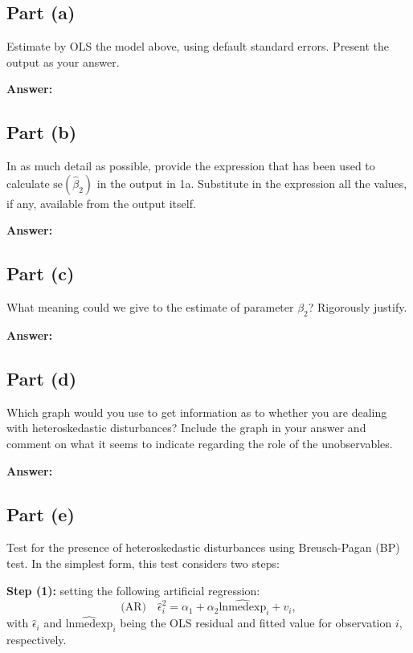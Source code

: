 \documentclass[12pt,a4paper]{article}
\begin{document}
\subsection*{Part (a)}
Estimate by OLS the model above, using default standard errors. Present the output as your answer.

\textbf{Answer:}



\subsection*{Part (b)}
In as much detail as possible, provide the expression that has been used to calculate $\text{se}(\hat{\beta}_2)$ in the output in 1a. Substitute in the expression all the values, if any, available from the output itself.

\textbf{Answer:}



\subsection*{Part (c)}
What meaning could we give to the estimate of parameter $\beta_2$? Rigorously justify.

\textbf{Answer:}



\subsection*{Part (d)}
Which graph would you use to get information as to whether you are dealing with heteroskedastic disturbances? Include the graph in your answer and comment on what it seems to indicate regarding the role of the unobservables.

\textbf{Answer:}



\subsection*{Part (e)}
Test for the presence of heteroskedastic disturbances using Breusch-Pagan (BP) test. In the simplest form, this test considers two steps:

\textbf{Step (1):} setting the following artificial regression:
\[
\text{(AR)} \quad \hat{\epsilon}_i^2 = \alpha_1 + \alpha_2\widehat{\text{lnmedexp}}_i + v_i,
\]
with $\hat{\epsilon}_i$ and $\widehat{\text{lnmedexp}}_i$ being the OLS residual and fitted value for observation $i$, respectively.
\end{document}
